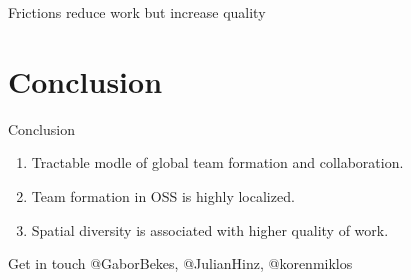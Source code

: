 \documentclass[
  ignorenonframetext,
  aspectratio=169,
]{beamer}
\providecommand{\tightlist}{%
  \setlength{\itemsep}{0pt}\setlength{\parskip}{0pt}}
\begin{document}
\begin{frame}{Frictions reduce work but increase quality}
\protect\hypertarget{frictions-reduce-work-but-increase-quality}{}
\vspace*{-2ex}\hspace*{-2em}
\end{frame}

\section{Conclusion}\label{conclusion}

\begin{frame}{Conclusion}
\begin{enumerate}
\tightlist
\item
  Tractable modle of global team formation and collaboration.
\item
  Team formation in OSS is highly localized.
\item
  Spatial diversity is associated with higher quality of work.
\end{enumerate}
\end{frame}

\begin{frame}{Get in touch}
\protect\hypertarget{get-in-touch}{}
@GaborBekes, @JulianHinz, @korenmiklos
\end{frame}
\end{document}
